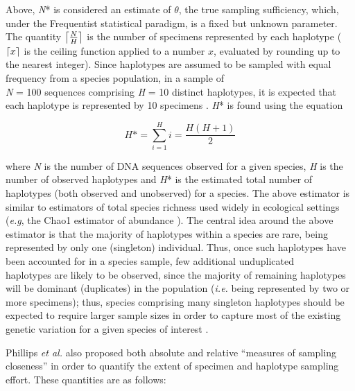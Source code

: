 Above, \textit{N}* is considered an estimate of $\theta$, the true sampling sufficiency, which, under the Frequentist statistical paradigm, is a fixed but unknown parameter. The quantity $\ceil*{\frac{N}{H}}$ is the number of specimens represented by each haplotype ($\ceil{x}$ is the ceiling function applied to a number $x$, evaluated by rounding up to the nearest integer). Since haplotypes are assumed to be sampled with equal frequency from a species population, in a sample of \\ \textit{N} = 100 sequences comprising \textit{H} = 10 distinct haplotypes, it is expected that each haplotype is represented by 10 specimens \cite{phillips2015exploration}. \textit{H}* is found using the equation

\begin{equation}
H\mbox{*}=\sum_{i=1}^H i = \frac{H(H+1)}{2}
\label{eqn}
\end{equation}

\vspace{1mm}

\noindent where \textit{N} is the number of DNA sequences observed for a given species, \textit{H} is the number of observed haplotypes and \textit{H}* is the estimated total number of haplotypes (both observed and unobserved) for a species. The above estimator is similar to estimators of total species richness used widely in ecological settings (\textit{e.g}, the Chao1 estimator of abundance \cite{chao1984nonparametric}). The central idea around the above estimator is that the majority of haplotypes within a species are rare, being represented by only one (singleton) individual. Thus, once such haplotypes have been accounted for in a species sample, few additional unduplicated \\ haplotypes are likely to be observed, since the majority of remaining haplotypes will be dominant (duplicates) in the population (\textit{i.e.} being represented by two or more specimens); thus, species comprising many singleton haplotypes should be expected to require larger sample sizes in order to capture most of the existing genetic variation for a given species of interest \cite{phillips2015exploration, williams2016early}.


  
Phillips \textit{et al.} \cite{phillips2015exploration} also proposed both absolute and relative ``measures of sampling closeness'' in order to quantify the extent of specimen and haplotype sampling effort. These quantities are as follows:

